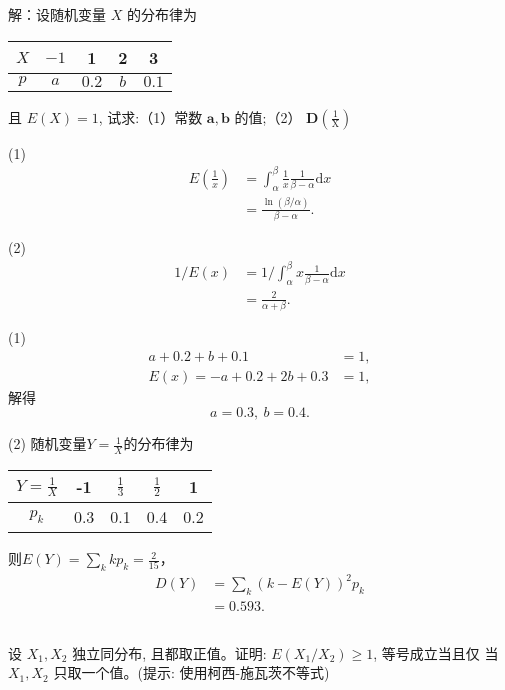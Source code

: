 \documentclass[UTF8,a4paper,10pt]{ctexart}
\begin{document}
解：设随机变量 $X$ 的分布律为
\begin{center}
\begin{tabular}{|c|c|c|c|c|}
\hline$X$ & $-1$ & 1 & 2 & 3 \\
\hline$p$ & $a$ & $0.2$ & $b$ & $0.1$ \\
\hline
\end{tabular}

\end{center}

且 $E(X)=1$, 试求:（1）常数 $\boldsymbol{a}, \boldsymbol{b}$ 的值;（2） $\boldsymbol{D}\left(\frac{1}{\mathrm{X}}\right)$

(1) 
\begin{align}
    E\left(\frac{1}{x}\right) &= \int_{\alpha}^{\beta} \frac{1}{x}\frac{1}{\beta - \alpha} \text{d} x \nonumber \\
                              &= \frac{\ln(\beta/\alpha)}{\beta - \alpha}.
\end{align}

(2)
\begin{align}
    1 / E(x) &= 1 / \int_{\alpha}^{\beta} x \frac{1}{\beta - \alpha} \text{d} x \nonumber \\
             &= \frac{2}{\alpha + \beta}.
\end{align}

(1)
\begin{align}
    a + 0.2 + b + 0.1 &= 1, \\
    E(x) = -a + 0.2 + 2b + 0.3 &= 1,
\end{align}
解得
\begin{equation}
    a = 0.3,~b = 0.4.
\end{equation}

(2) 随机变量$Y = \displaystyle\frac{1}{X}$的分布律为
\begin{center}
    \begin{tabular}{c|cccc}
        $Y = \frac{1}{X}$ & -1 & $\frac{1}{3}$ & $\frac{1}{2}$ & 1 \\
        \hline
        $p_k$ & 0.3 & 0.1 & 0.4 & 0.2 
    \end{tabular}
\end{center}

则$E(Y) = \displaystyle\sum_{k}kp_k = \displaystyle\frac{2}{15}$，
\begin{align}
    D(Y) &= \sum_k (k - E(Y))^2p_k \nonumber \\
         &= 0.593.
\end{align}


\subsection{}
设 $X_{1}, X_{2}$ 独立同分布, 且都取正值。证明: $E\left(X_{1} / X_{2}\right) \geq 1$, 等号成立当且仅 当 $X_{1}, X_{2}$ 只取一个值。(提示: 使用柯西-施瓦茨不等式)
\end{document}
